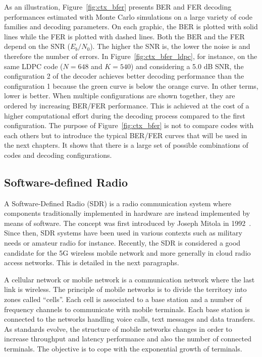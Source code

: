 As an illustration, Figure~\ref{fig:ctx_bfer} presents BER and FER decoding
performances estimated with Monte Carlo simulations on a large variety of code
families and decoding parameters. On each graphic, the BER is plotted with solid
lines while the FER is plotted with dashed lines. Both the BER and the FER
depend on the SNR ($E_b/N_0$). The higher the SNR is, the lower the noise is and
therefore the number of errors. In Figure~\ref{fig:ctx_bfer_ldpc}, for instance,
on the same LDPC code ($N = 648$ and $K = 540$) and considering a 5.0 dB SNR,
the configuration 2 of the decoder achieves better decoding performance than the
configuration 1 because the {\color{Paired-3} green} curve is below the
{\color{Paired-7} orange} curve. In other terms, lower is better. When multiple
configurations are shown together, they are ordered by increasing BER/FER
performance. This is achieved at the cost of a higher computational effort
during the decoding process compared to the first configuration. The purpose of
Figure~\ref{fig:ctx_bfer} is not to compare codes with each others but to
introduce the typical BER/FER curves that will be used in the next chapters. It
shows that there is a large set of possible combinations of codes and decoding
configurations.

\newpage
\subsection{Software-defined Radio}

A Software-Defined Radio (SDR) is a radio communication system where components
traditionally implemented in hardware are instead implemented by means of
software. The concept was first introduced by Joseph Mitola in
1992~\cite{Mitola1992,Mitola1993}. Since then, SDR systems have been used in
various contexts such as military needs or amateur radio for instance. Recently,
the SDR is considered a good candidate for the 5G wireless mobile network and
more generally in cloud radio access networks. This is detailed in the next
paragraphs.

A cellular network or mobile network is a communication network where the last
link is wireless. The principle of mobile networks is to divide the territory
into zones called ``cells''. Each cell is associated to a base station and a
number of frequency channels to communicate with mobile terminals. Each base
station is connected to the networks handling voice calls, text messages and
data transfers. As standards evolve, the structure of mobile networks changes in
order to increase throughput and latency performance and also the number of
connected terminals. The objective is to cope with the exponential growth of
terminals.

